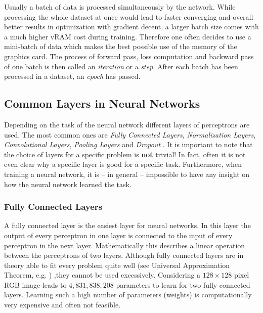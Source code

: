 Usually a batch of data is processed simultaneously by the network. While processing the whole dataset at once would lead to faster converging and overall better results in optimization with gradient decent, a larger batch size comes with a much higher vRAM cost during training. Therefore one often decides to use a mini-batch of data which makes the best possible use of the memory of the graphics card. The process of forward pass, loss computation and backward pass of one batch is then called an \textit{iteration} or a \textit{step}. After each batch has been processed in a dataset, an \textit{epoch} has passed.
%
\subsection{Common Layers in Neural Networks} \label{sec:2.1.3}
Depending on the task of the neural network different layers of perceptrons are used. The most common ones are \textit{Fully Connected Layers}, \textit{Normalization Layers}, \textit{Convolutional Layers}, \textit{Pooling 
Layers} and \textit{Dropout }. It is important to note that the choice of layers for a specific problem is \textbf{not} trivial! In fact, often it is not even clear why a specific layer is good for a specific task. Furthermore, when training a neural network, it is – in general – impossible to have any insight on how the neural network learned the task.
%
\subsubsection{Fully Connected Layers}
A fully connected layer is the easiest layer for neural networks. In this layer the output of every perceptron in one layer is connected to the input of every perceptron in the next layer. Mathematically this describes a linear operation between the perceptrons of two layers. Although fully connected layers are in theory able to fit every problem quite well (see Universal Approximation Theorem, e.g. \cite{universal_appr_theorem}) ,they cannot be used excessively. Considering a $128\times128$ pixel RGB image leads to $4,831,838,208$ parameters to learn for two fully connected layers. Learning such a high number of parameters (weights) is computationally very expensive and often not feasible.
%
